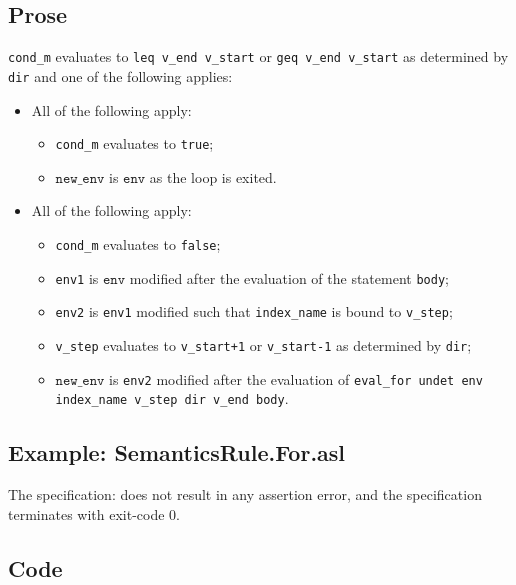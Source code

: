 \documentclass{book}
\newcommand\newenv[0]{\texttt{new\_env}}
\newcommand\env[0]{\texttt{env}}
\begin{document}
    \subsection{Prose}
    \texttt{cond\_m} evaluates to \texttt{leq v\_end v\_start} or \texttt{geq
v\_end v\_start} as determined by \texttt{dir} and one of the following
applies:
    \begin{itemize}
    \item All of the following apply:
      \begin{itemize}
      \item \texttt{cond\_m} evaluates to \texttt{true};
      \item $\newenv$ is $\env$ as the loop is exited.
      \end{itemize}
    \item All of the following apply:
      \begin{itemize}
      \item \texttt{cond\_m} evaluates to \texttt{false};
      \item \texttt{env1} is $\env$ modified after the evaluation of the statement \texttt{body};
      \item \texttt{env2} is \texttt{env1} modified such that \texttt{index\_name} is bound to \texttt{v\_step};
      \item \texttt{v\_step} evaluates to \texttt{v\_start+1} or \texttt{v\_start-1} as determined by \texttt{dir};
      \item $\newenv$ is \texttt{env2} modified after the evaluation of \texttt{eval\_for undet
        env index\_name v\_step dir v\_end body}.
      \end{itemize}
    \end{itemize}

    \subsection{Example: SemanticsRule.For.asl}
    The specification:
    does not result in any assertion error, and the specification terminates with exit-code $0$.

    \subsection{Code}
\end{document}
